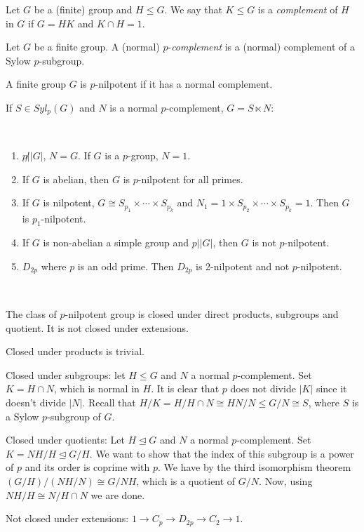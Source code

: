 \documentclass[twoside, 11pt]{article}
\begin{document}
\begin{defi}
Let $G$ be a (finite) group and $H\leq G$. We say that $K\leq G$ is a \emph{complement} of $H$ in $G$ if $G=HK$ and $K\cap H=1$. 
\end{defi}


\begin{defi}
Let $G$ be a finite group. A (normal) $p$-\emph{complement} is a (normal) complement of a Sylow $p$-subgroup.
\end{defi}

\begin{defi}
A finite group $G$ is $p$-nilpotent if it has a normal complement. 
\end{defi}

If $S\in Syl_p(G)$ and $N$ is a normal $p$-complement, $G=S\ltimes N$:

\begin{ej}\
\begin{enumerate}
\item $p\not| |G|$, $N=G$. If $G$ is a $p$-group, $N=1$.
\item If $G$ is abelian, then $G$ is $p$-nilpotent for all primes. 
\item If $G$ is nilpotent, $G\cong S_{p_1}\times\cdots\times S_{p_k}$ and $N_1=1\times S_{p_2}\times\cdots\times S_{p_k}=1$. Then $G$ is $p_1$-nilpotent.
\item If $G$ is non-abelian a simple group and $p||G|$, then $G$ is not $p$-nilpotent. 
\item $D_{2p}$ where $p$ is an odd prime. Then $D_{2p}$ is 2-nilpotent and not $p$-nilpotent.  
\end{enumerate}
\end{ej}


\begin{prop}\

The class of $p$-nilpotent group is closed under direct products, subgroups and quotient. It is not closed under extensions.



\end{prop}
\begin{dem}
Closed under products is trivial.

Closed under subgroups: let $H\leq G$ and $N$ a normal $p$-complement. Set $K=H\cap N$, which is normal in $H$. It is clear that $p$ does not divide $|K|$ since it doesn't divide $|N|$. Recall that $H/K=H/H\cap N\cong HN/N\leq G/N\cong S$, where $S$ is a Sylow $p$-subgroup of $G$.

Closed under quotients: Let $H\trianglelefteq G$ and $N$ a normal $p$-complement. Set $K=NH/H\trianglelefteq G/H$. We want to show that the index of this subgroup is a power of $p$ and its order is coprime with $p$. We have by the third isomorphism theorem $(G/H)/(NH/N)\cong G/NH$, which is a quotient of $G/N$. Now, using $NH/H\cong N/H\cap N$ we are done.  

Not closed under extensions: $1\to C_p\to D_{2p}\to C_2\to 1$.
\end{dem}
\end{document}
